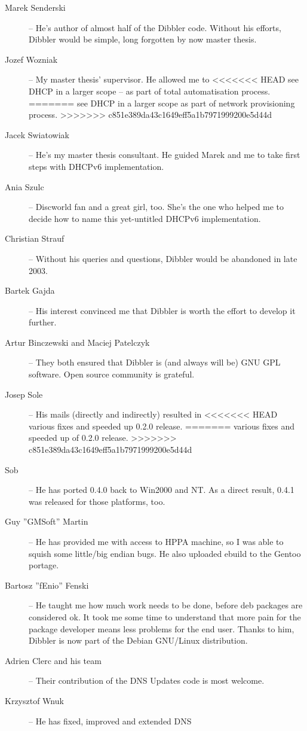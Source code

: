 \begin{description}
\item[Marek Senderski] -- He's author of almost half of the Dibbler
  code. Without his efforts, Dibbler would be simple, long forgotten
  by now master thesis.
\item[Jozef Wozniak] -- My master thesis' supervisor. He allowed me to
<<<<<<< HEAD
  see DHCP in a larger scope -- as part of total automatisation process.
=======
  see DHCP in a larger scope as part of network provisioning process.
>>>>>>> c851e389da43c1649eff5a1b7971999200e5d44d
\item[Jacek Swiatowiak] -- He's my master thesis consultant. He guided
  Marek and me to take first steps with DHCPv6 implementation.
\item[Ania Szulc] -- Discworld fan and a great girl, too. She's the one
  who helped me to decide how to name this yet-untitled DHCPv6 implementation.
\item[Christian Strauf] -- Without his queries and questions, Dibbler
  would be abandoned in late 2003.
\item[Bartek Gajda] -- His interest convinced me that Dibbler is worth
  the effort to develop it further.
\item[Artur Binczewski and Maciej Patelczyk] -- They both ensured that
  Dibbler is (and always will be) GNU GPL software. Open source
  community is grateful.
\item[Josep Sole] -- His mails (directly and indirectly) resulted in
<<<<<<< HEAD
  various fixes and speeded up 0.2.0 release.
=======
  various fixes and speeded up of 0.2.0 release.
>>>>>>> c851e389da43c1649eff5a1b7971999200e5d44d
\item[Sob] -- He has ported 0.4.0 back to Win2000 and NT. As a direct
  result, 0.4.1 was released for those platforms, too.
\item[Guy ''GMSoft'' Martin] -- He has provided me with access to HPPA
  machine, so I was able to squish some little/big endian bugs. He
  also uploaded ebuild to the Gentoo portage.
\item[Bartosz ''fEnio'' Fenski] -- He taught me how much work needs to
  be done, before deb packages are considered ok. It took me some time
  to understand that more pain for the package developer means less
  problems for the end user.  Thanks to him, Dibbler is now part of
  the Debian GNU/Linux distribution.
\item[Adrien Clerc and his team] -- Their contribution of the DNS
  Updates code is most welcome.
\item[Krzysztof Wnuk] -- He has fixed, improved and extended DNS

\end{description}
